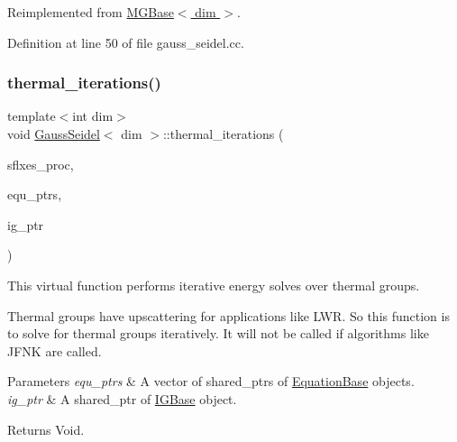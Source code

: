 Reimplemented from \hyperlink{class_m_g_base_a55ba9bef3616dd5eab9e3986f6e8e311}{M\+G\+Base$<$ dim $>$}.



Definition at line 50 of file gauss\+\_\+seidel.\+cc.

\mbox{\label{class_gauss_seidel_a8db6abbdc88413cbf502ac606b415733}} 
\subsubsection{\texorpdfstring{thermal\+\_\+iterations()}{thermal\_iterations()}}
{\footnotesize\ttfamily template$<$int dim$>$ \\
void \hyperlink{class_gauss_seidel}{Gauss\+Seidel}$<$ dim $>$\+::thermal\+\_\+iterations (\begin{DoxyParamCaption}\item[{std\+::vector$<$ Vector$<$ double $>$ $>$ \&}]{sflxes\+\_\+proc,  }\item[{std\+::vector$<$ std\+\_\+cxx11\+::shared\+\_\+ptr$<$ \hyperlink{class_equation_base}{Equation\+Base}$<$ dim $>$ $>$ $>$ \&}]{equ\+\_\+ptrs,  }\item[{std\+\_\+cxx11\+::shared\+\_\+ptr$<$ \hyperlink{class_i_g_base}{I\+G\+Base}$<$ dim $>$ $>$}]{ig\+\_\+ptr }\end{DoxyParamCaption})\hspace{0.3cm}{\ttfamily [virtual]}}

This virtual function performs iterative energy solves over thermal groups.

Thermal groups have upscattering for applications like L\+WR. So this function is to solve for thermal groups iteratively. It will not be called if algorithms like J\+F\+NK are called.


\begin{DoxyParams}{Parameters}
{\em equ\+\_\+ptrs} & A vector of shared\+\_\+ptr\textquotesingle{}s of \hyperlink{class_equation_base}{Equation\+Base} objects. \\
\hline
{\em ig\+\_\+ptr} & A shared\+\_\+ptr of \hyperlink{class_i_g_base}{I\+G\+Base} object. \\
\hline
\end{DoxyParams}
\begin{DoxyReturn}{Returns}
Void. 
\end{DoxyReturn}



